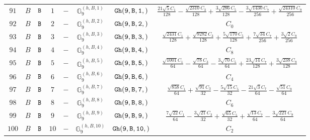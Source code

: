 \documentclass[fleqn,8pt]{jsarticle}
\begin{document}
\begin{table}[ht!]
\begin{center}
\begin{tabular}{cccccccc}
$ 91 $ & $ B $ & $ {\tt B} $ & $ 1 $ & $ - $ & $ \mathbb{G}_{9}^{(h,B,1)} $ & $ {\tt Gh(9,B,1,)} $ & $ \frac{21 \sqrt{5} C_{1}}{128} - \frac{\sqrt{2310} C_{3}}{128} + \frac{3 \sqrt{286} C_{5}}{128} - \frac{3 \sqrt{1430} C_{7}}{256} + \frac{\sqrt{24310} C_{9}}{256} $ \\
$ 92 $ & $ B $ & $ {\tt B} $ & $ 2 $ & $ - $ & $ \mathbb{G}_{9}^{(h,B,2)} $ & $ {\tt Gh(9,B,2,)} $ & $ C_{0} $ \\
$ 93 $ & $ B $ & $ {\tt B} $ & $ 3 $ & $ - $ & $ \mathbb{G}_{9}^{(h,B,3)} $ & $ {\tt Gh(9,B,3,)} $ & $ \frac{\sqrt{2431} C_{1}}{128} + \frac{\sqrt{9282} C_{3}}{128} + \frac{5 \sqrt{170} C_{5}}{128} + \frac{7 \sqrt{34} C_{7}}{256} + \frac{3 \sqrt{2} C_{9}}{256} $ \\
$ 94 $ & $ B $ & $ {\tt B} $ & $ 4 $ & $ - $ & $ \mathbb{G}_{9}^{(h,B,4)} $ & $ {\tt Gh(9,B,4,)} $ & $ C_{8} $ \\
$ 95 $ & $ B $ & $ {\tt B} $ & $ 5 $ & $ - $ & $ \mathbb{G}_{9}^{(h,B,5)} $ & $ {\tt Gh(9,B,5,)} $ & $ \frac{\sqrt{1001} C_{1}}{64} - \frac{\sqrt{78} C_{3}}{64} - \frac{3 \sqrt{70} C_{5}}{64} + \frac{23 \sqrt{14} C_{7}}{128} + \frac{3 \sqrt{238} C_{9}}{128} $ \\
$ 96 $ & $ B $ & $ {\tt B} $ & $ 6 $ & $ - $ & $ \mathbb{G}_{9}^{(h,B,6)} $ & $ {\tt Gh(9,B,6,)} $ & $ C_{4} $ \\
$ 97 $ & $ B $ & $ {\tt B} $ & $ 7 $ & $ - $ & $ \mathbb{G}_{9}^{(h,B,7)} $ & $ {\tt Gh(9,B,7,)} $ & $ \frac{\sqrt{858} C_{1}}{64} + \frac{\sqrt{91} C_{3}}{32} - \frac{5 \sqrt{15} C_{5}}{32} - \frac{21 \sqrt{3} C_{7}}{64} - \frac{\sqrt{51} C_{9}}{64} $ \\
$ 98 $ & $ B $ & $ {\tt B} $ & $ 8 $ & $ - $ & $ \mathbb{G}_{9}^{(h,B,8)} $ & $ {\tt Gh(9,B,8,)} $ & $ C_{6} $ \\
$ 99 $ & $ B $ & $ {\tt B} $ & $ 9 $ & $ - $ & $ \mathbb{G}_{9}^{(h,B,9)} $ & $ {\tt Gh(9,B,9,)} $ & $ \frac{7 \sqrt{22} C_{1}}{64} - \frac{3 \sqrt{21} C_{3}}{32} + \frac{\sqrt{65} C_{5}}{32} + \frac{\sqrt{13} C_{7}}{64} - \frac{3 \sqrt{221} C_{9}}{64} $ \\
$ 100 $ & $ B $ & $ {\tt B} $ & $ 10 $ & $ - $ & $ \mathbb{G}_{9}^{(h,B,10)} $ & $ {\tt Gh(9,B,10,)} $ & $ C_{2} $ \\
 \hline \hline
\end{tabular}
\end{center}
\end{table}
\end{document}
